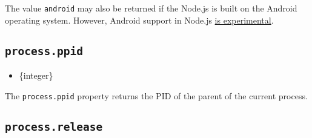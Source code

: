 The value \texttt{\textquotesingle{}android\textquotesingle{}} may also
be returned if the Node.js is built on the Android operating system.
However, Android support in Node.js
\href{https://github.com/nodejs/node/blob/HEAD/BUILDING.md\#androidandroid-based-devices-eg-firefox-os}{is
experimental}.

\subsection{\texorpdfstring{\texttt{process.ppid}}{process.ppid}}\label{process.ppid}

\begin{itemize}
\tightlist
\item
  \{integer\}
\end{itemize}

The \texttt{process.ppid} property returns the PID of the parent of the
current process.

\begin{Shaded}
\begin{Highlighting}[]
 \OperatorTok{;}

\NormalTok{(}\SpecialCharTok{$\{}\SpecialCharTok{\}}\VerbatimStringTok{\textasciigrave{}}\NormalTok{)}\OperatorTok{;}
\end{Highlighting}
\end{Shaded}

\begin{Shaded}
\begin{Highlighting}[]
\OperatorTok{=} \NormalTok{(}\NormalTok{)}\OperatorTok{;}

\NormalTok{(}\SpecialCharTok{$\{}\SpecialCharTok{\}}\VerbatimStringTok{\textasciigrave{}}\NormalTok{)}\OperatorTok{;}
\end{Highlighting}
\end{Shaded}

\subsection{\texorpdfstring{\texttt{process.release}}{process.release}}\label{process.release}

